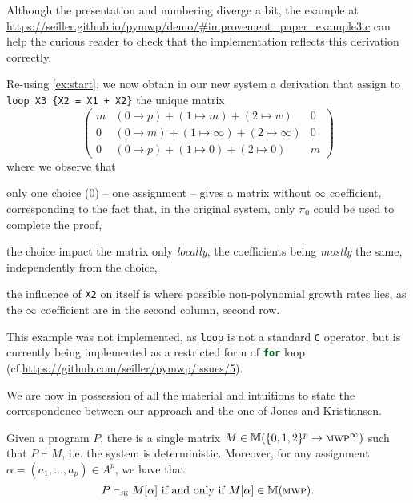 \documentclass[runningheads]{llncs}
\makeatletter
\newcommand{\mat}[1]{\left(\begin{smallmatrix}#1\end{smallmatrix}\right)} %
\newcommand{\pr}{\lstinline[mathescape]}
\newcommand{\prc}{\lstinline[language=C]}
\newcommand*{\cf}{cf.\@\xspace}
\newcommand*{\ie}{i.e.\@\xspace}
\newcommand{\vdashJK}{\vdash_{\textsc{jk}}} \allowdisplaybreaks[1] %
\makeatother
\begin{document}
\begin{example}
	Although the presentation and numbering diverge a bit, the example at \url{https://seiller.github.io/pymwp/demo/#improvement_paper_example3.c} can help the curious reader to check that the implementation reflects this derivation correctly.

\end{example}

\begin{example}
	Re-using \autoref{ex:start}, we now obtain in our new system a derivation that assign to \pr|loop X3 {X2 = X1 + X2}| the unique matrix
	\[
		\mat{m & (0 \mapsto p) + (1 \mapsto m) + (2 \mapsto w) &0 \\ 0 & (0 \mapsto m) + (1 \mapsto \infty) + (2 \mapsto \infty) & 0 \\ 0 & (0 \mapsto p) + (1 \mapsto 0) + (2 \mapsto 0) &m}
	\]
	where we observe that
	\begin{enumerate*}\item only one choice (0) -- one assignment -- gives a matrix without \(\infty\) coefficient, corresponding to the fact that, in the original system, only \(\pi_0\) could be used to complete the proof, \item the choice impact the matrix only \emph{locally}, the coefficients being \emph{mostly} the same, independently from the choice, \item the influence of \pr|X2| on itself is where possible non-polynomial growth rates lies, as the \(\infty\) coefficient are in the second column, second row.
	\end{enumerate*}
	This example was not implemented, as \pr|loop| is not a standard \texttt{C} operator, but is currently being implemented as a restricted form of \prc{for} loop (\cf \url{https://github.com/seiller/pymwp/issues/5}).
\end{example}

We are now in possession of all the material and intuitions to state the correspondence between our approach and the one of Jones and Kristiansen.

\begin{lemma}
	\label{lem:equi-expr}
	Given a program \(P\), there is a single matrix \(M\in \mathbb{M}(\{0,1,2\}^p\rightarrow\textsc{mwp}^\infty)\) such that \(P\vdash M\), \ie the system is deterministic. Moreover, for any assignment \(\alpha=(a_1,\dots,a_p)\in A^p\), we have that
	\[ P\vdashJK M[\alpha] \text{ if and only if } M[\alpha] \in \mathbb{M}(\textsc{mwp}). \]
\end{lemma}
\end{document}
